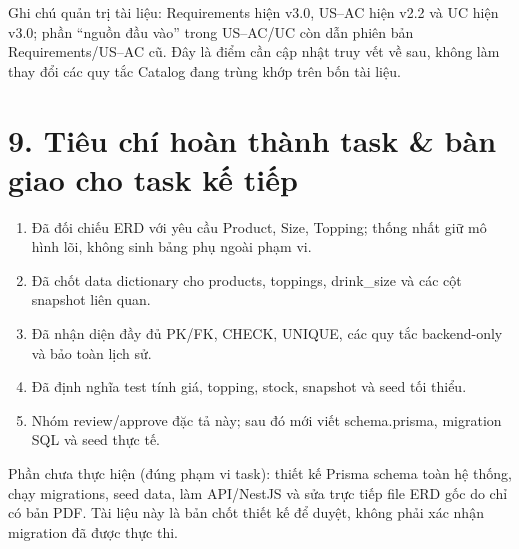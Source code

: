 \documentclass[11pt,a4paper,oneside]{report}
\begin{document}
Ghi chú quản trị tài liệu: Requirements hiện v3.0, US--AC hiện v2.2 và UC hiện v3.0; phần ``nguồn đầu vào'' trong US--AC/UC còn dẫn phiên bản Requirements/US--AC cũ. Đây là điểm cần cập nhật truy vết về sau, không làm thay đổi các quy tắc Catalog đang trùng khớp trên bốn tài liệu.

\section{9. Tiêu chí hoàn thành task \& bàn giao cho task kế tiếp}\label{06-product-data-model:tiuxeau-chuxed-houxe0n-thuxe0nh-task-buxe0n-giao-cho-task-kux1ebf-tiux1ebfp}

\begin{enumerate}
\def\labelenumi{\arabic{enumi}.}
\item
  Đã đối chiếu ERD với yêu cầu Product, Size, Topping; thống nhất giữ mô hình lõi, không sinh bảng phụ ngoài phạm vi.
\item
  Đã chốt data dictionary cho products, toppings, drink\_size và các cột snapshot liên quan.
\item
  Đã nhận diện đầy đủ PK/FK, CHECK, UNIQUE, các quy tắc backend-only và bảo toàn lịch sử.
\item
  Đã định nghĩa test tính giá, topping, stock, snapshot và seed tối thiểu.
\item
  Nhóm review/approve đặc tả này; sau đó mới viết schema.prisma, migration SQL và seed thực tế.
\end{enumerate}

Phần chưa thực hiện (đúng phạm vi task): thiết kế Prisma schema toàn hệ thống, chạy migrations, seed data, làm API/NestJS và sửa trực tiếp file ERD gốc do chỉ có bản PDF. Tài liệu này là bản chốt thiết kế để duyệt, không phải xác nhận migration đã được thực thi.
\end{document}
